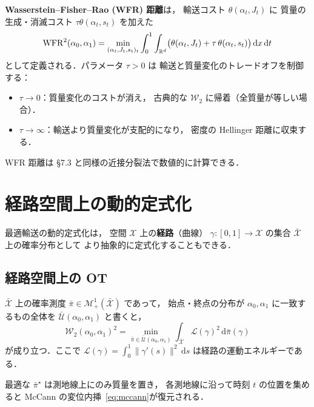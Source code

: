 \textbf{Wasserstein--Fisher--Rao (WFR) 距離}は，
輸送コスト $\theta(\alpha_t, J_t)$ に
質量の生成・消滅コスト $\tau \theta(\alpha_t, s_t)$ を加えた
\begin{equation}\label{eq:wfr}
  \mathrm{WFR}^2(\alpha_0, \alpha_1)
  = \min_{(\alpha_t, J_t, s_t)_t}
  \int_0^1 \int_{\mathbb{R}^d}
  \bigl(\theta(\alpha_t, J_t) + \tau\, \theta(\alpha_t, s_t)\bigr)
  \, \mathrm{d}x\, \mathrm{d}t
\end{equation}
として定義される．パラメータ $\tau > 0$ は
輸送と質量変化のトレードオフを制御する：
\begin{itemize}
  \item $\tau \to 0$：質量変化のコストが消え，
    古典的な $\mathcal{W}_2$ に帰着（全質量が等しい場合）．
  \item $\tau \to \infty$：輸送より質量変化が支配的になり，
    密度の Hellinger 距離に収束する．
\end{itemize}

WFR 距離は §7.3 と同様の近接分裂法で数値的に計算できる．


\section{経路空間上の動的定式化}\label{sec:paths-space}

最適輸送の動的定式化は，
空間 $\mathcal{X}$ 上の\textbf{経路}（曲線）
$\gamma : [0, 1] \to \mathcal{X}$
の集合 $\bar{\mathcal{X}}$ 上の確率分布として
より抽象的に定式化することもできる．

\subsection{経路空間上の OT}\label{subsec:ot-paths}

$\bar{\mathcal{X}}$ 上の確率測度
$\bar{\pi} \in \mathcal{M}^1_+(\bar{\mathcal{X}})$ であって，
始点・終点の分布が $\alpha_0, \alpha_1$ に一致するもの全体を
$\bar{\mathcal{U}}(\alpha_0, \alpha_1)$ と書くと，
\begin{equation}\label{eq:ot-paths}
  \mathcal{W}_2(\alpha_0, \alpha_1)^2
  = \min_{\bar{\pi} \in \bar{\mathcal{U}}(\alpha_0, \alpha_1)}
  \int_{\bar{\mathcal{X}}} \mathcal{L}(\gamma)^2\, \mathrm{d}\bar{\pi}(\gamma)
\end{equation}
が成り立つ．ここで
$\mathcal{L}(\gamma) = \int_0^1 \|\gamma'(s)\|^2\, \mathrm{d}s$
は経路の運動エネルギーである．

最適な $\bar{\pi}^\star$ は測地線上にのみ質量を置き，
各測地線に沿って時刻 $t$ の位置を集めると
McCann の変位内挿~\eqref{eq:mccann}が復元される．

